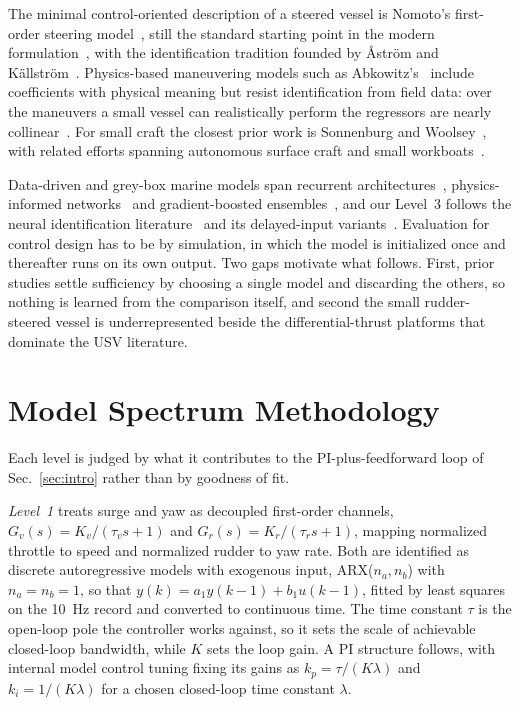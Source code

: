 \documentclass[conference]{IEEEtran}
\begin{document}
The minimal control-oriented description of a steered vessel is Nomoto's first-order steering model~\cite{nomoto1957steering}, still the standard starting point in the modern formulation~\cite{fossen2011handbook}, with the identification tradition founded by {\AA}str{\"o}m and K{\"a}llstr{\"o}m~\cite{astrom1976identification}. Physics-based maneuvering models such as Abkowitz's~\cite{abkowitz1964lectures} include coefficients with physical meaning but resist identification from field data: over the maneuvers a small vessel can realistically perform the regressors are nearly collinear~\cite{suarez2026regularized,alexandersson2022system,xu2025review}. For small craft the closest prior work is Sonnenburg and Woolsey~\cite{sonnenburg2013modeling,sonnenburg2010control}, with related efforts spanning autonomous surface craft and small workboats~\cite{eriksen2017modeling,muske2008identification,wirtensohn2013modelling,morel2025practical,sarda2016nmpc}.

Data-driven and grey-box marine models span recurrent architectures~\cite{woo2018dynamic}, physics-informed networks~\cite{xu2022pinn} and gradient-boosted ensembles~\cite{zhang2024gbm}, and our Level~3 follows the neural identification literature~\cite{narendra1990identification} and its delayed-input variants~\cite{lin1997delay}. Evaluation for control design has to be by simulation, in which the model is initialized once and thereafter runs on its own output. 
Two gaps motivate what follows. First, prior studies settle sufficiency by choosing a single model and discarding the others, so nothing is learned from the comparison itself, and second the small rudder-steered vessel is underrepresented beside the differential-thrust platforms that dominate the USV literature.

\section{Model Spectrum Methodology}
\label{sec:methodology}

Each level is judged by what it contributes to the PI-plus-feedforward loop of Sec.~\ref{sec:intro} rather than by goodness of fit. 

\emph{Level~1} treats surge and yaw as decoupled first-order channels, $G_v(s)=K_v/(\tau_v s+1)$ and $G_r(s)=K_r/(\tau_r s+1)$, mapping normalized throttle to speed and normalized rudder to yaw rate. Both are identified as discrete autoregressive models with exogenous input, ARX($n_a,n_b$) with $n_a=n_b=1$, so that $y(k)=a_1y(k-1)+b_1u(k-1)$, fitted by least squares on the 10~Hz record and converted to continuous time. 
The time constant $\tau$ is the open-loop pole the controller works against, so it sets the scale of achievable closed-loop bandwidth, while $K$ sets the loop gain. A PI structure follows, with internal model control tuning fixing its gains as $k_p=\tau/(K\lambda)$ and $k_i=1/(K\lambda)$ for a chosen closed-loop time constant $\lambda$.
\end{document}
